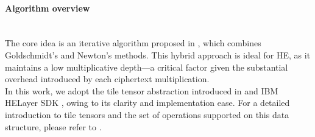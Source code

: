 \documentclass[article]{iacrtrans}
\begin{document}
\paragraph{Algorithm overview}\mbox{}\\

The core idea is an iterative algorithm proposed in \cite{Ahn2024}, which combines Goldschmidt’s and Newton’s methods. This hybrid approach is ideal for HE, as it maintains a low multiplicative depth—a critical factor given the substantial overhead introduced by each ciphertext multiplication.\\
In this work, we adopt the tile tensor abstraction introduced in \cite{Aharoni2023} and IBM HELayer SDK \cite{IBMHeLayers}, owing to its clarity and implementation ease. For a detailed introduction to tile tensors and the set of operations supported on this data structure, please refer to \cite{Aharoni2023}.
\end{document}
